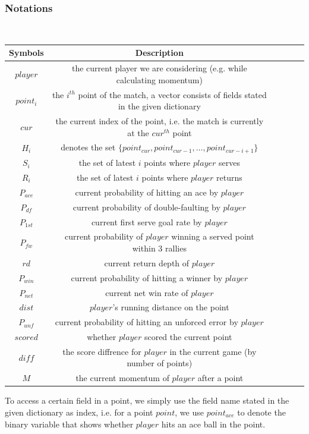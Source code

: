 \subsubsection{Notations}~{}

\begin{table}[H]
\centering
\begin{tabular}{cccccc}
    
    \toprule
    Symbols & Description \\ 
    \midrule
    $player$ & the current player we are considering (e.g. while calculating momentum) \\
    $point_i$ & the $i^{th}$ point of the match, a vector consists of fields stated in the given dictionary \\
    $cur$ & the current index of the point, i.e. the match is currently at the $cur^{th}$ point \\
    $H_i$ & denotes the set $\{point_{cur}, point_{cur - 1}, \ldots , point_{cur - i + 1}\}$ \\
    $S_i$ & the set of latest $i$ points where $player$ serves\\
    $R_i$ & the set of latest $i$ points where $player$ returns\\
    $P_{ace}$ & current probability of hitting an ace by $player$ \\
    $P_{df}$ & current probability of double-faulting by $player$ \\
    $P_{1st}$ & current first serve goal rate by $player$ \\
    $P_{fw}$ & current probability of $player$ winning a served point within 3 rallies \\
    $rd$ & current return depth of $player$ \\
    $P_{win}$ & current probability of hitting a winner by $player$ \\
    $P_{net}$ & current net win rate of $player$ \\
    $dist$ & $player$'s running distance on the point \\
    $P_{unf}$ & current probability of hitting an unforced error by $player$ \\
    $scored$ & whether $player$ scored the current point \\
    $diff$ & the score diffrence for $player$ in the current game (by number of points) \\
    $M$ & the current momentum of $player$ after a point \\

    \bottomrule
\end{tabular}
\end{table}
To access a certain field in a point, we simply use the field name stated in the given 
dictionary as index, i.e. for a point $point$, we use $point_{ace}$ to denote the binary 
variable that shows whether $player$ hits an ace ball in the point.


